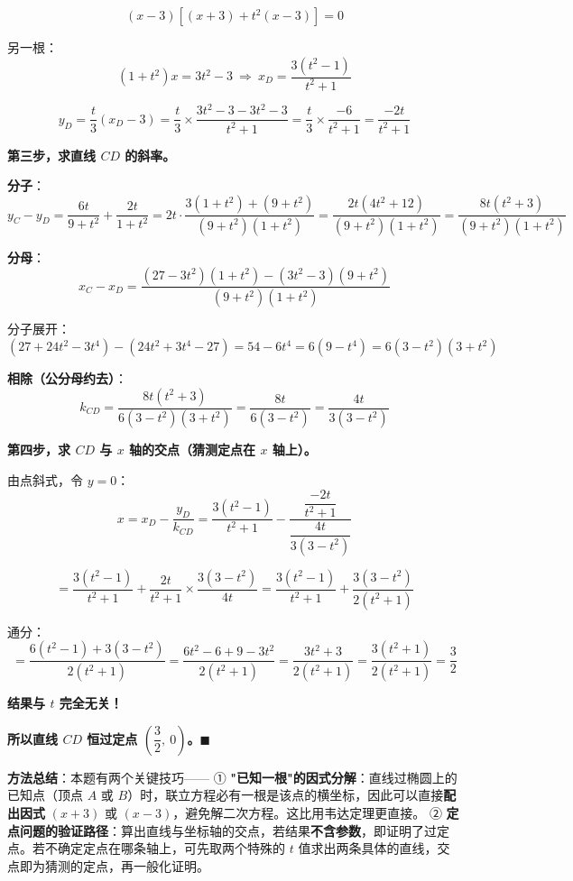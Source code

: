 \[(x-3)\left[(x+3)+t^{2}(x-3)\right]=0\]

另一根：
\[\left(1+t^{2}\right)x=3t^{2}-3\ \Longrightarrow\ x_D=\frac{3\left(t^{2}-1\right)}{t^{2}+1}\]

\[y_D=\frac t3\left(x_D-3\right)=\frac t3\times\frac{3t^{2}-3-3t^{2}-3}{t^{2}+1}=\frac t3\times\frac{-6}{t^{2}+1}=\frac{-2t}{t^{2}+1}\]

\textbf{第三步，求直线 $CD$ 的斜率。}

\textbf{分子}：
\[y_C-y_D=\frac{6t}{9+t^{2}}+\frac{2t}{1+t^{2}}=2t\cdot\frac{3\left(1+t^{2}\right)+\left(9+t^{2}\right)}{\left(9+t^{2}\right)\left(1+t^{2}\right)}=\frac{2t\left(4t^{2}+12\right)}{\left(9+t^{2}\right)\left(1+t^{2}\right)}=\frac{8t\left(t^{2}+3\right)}{\left(9+t^{2}\right)\left(1+t^{2}\right)}\]

\textbf{分母}：
\[x_C-x_D=\frac{\left(27-3t^{2}\right)\left(1+t^{2}\right)-\left(3t^{2}-3\right)\left(9+t^{2}\right)}{\left(9+t^{2}\right)\left(1+t^{2}\right)}\]

分子展开：
\[\left(27+24t^{2}-3t^{4}\right)-\left(24t^{2}+3t^{4}-27\right)=54-6t^{4}=6\left(9-t^{4}\right)=6\left(3-t^{2}\right)\left(3+t^{2}\right)\]

\textbf{相除（公分母约去）}：
\[k_{CD}=\frac{8t\left(t^{2}+3\right)}{6\left(3-t^{2}\right)\left(3+t^{2}\right)}=\frac{8t}{6\left(3-t^{2}\right)}=\frac{4t}{3\left(3-t^{2}\right)}\]

\textbf{第四步，求 $CD$ 与 $x$ 轴的交点（猜测定点在 $x$ 轴上）。}

由点斜式，令 $y=0$：
\[x=x_D-\frac{y_D}{k_{CD}}=\frac{3\left(t^{2}-1\right)}{t^{2}+1}-\frac{\dfrac{-2t}{t^{2}+1}}{\dfrac{4t}{3\left(3-t^{2}\right)}}\]

\[=\frac{3\left(t^{2}-1\right)}{t^{2}+1}+\frac{2t}{t^{2}+1}\times\frac{3\left(3-t^{2}\right)}{4t}=\frac{3\left(t^{2}-1\right)}{t^{2}+1}+\frac{3\left(3-t^{2}\right)}{2\left(t^{2}+1\right)}\]

通分：
\[=\frac{6\left(t^{2}-1\right)+3\left(3-t^{2}\right)}{2\left(t^{2}+1\right)}=\frac{6t^{2}-6+9-3t^{2}}{2\left(t^{2}+1\right)}=\frac{3t^{2}+3}{2\left(t^{2}+1\right)}=\frac{3\left(t^{2}+1\right)}{2\left(t^{2}+1\right)}=\frac32\]

\textbf{结果与 $t$ 完全无关！}

\textbf{所以直线 $CD$ 恒过定点 $\left(\dfrac32,\ 0\right)$。$\blacksquare$}

\begin{gktip}
\textbf{方法总结}：本题有两个关键技巧——
① \textbf{"已知一根"的因式分解}：直线过椭圆上的已知点（顶点 $A$ 或 $B$）时，联立方程必有一根是该点的横坐标，因此可以直接\textbf{配出因式} $(x+3)$ 或 $(x-3)$，避免解二次方程。这比用韦达定理更直接。
② \textbf{定点问题的验证路径}：算出直线与坐标轴的交点，若结果\textbf{不含参数}，即证明了过定点。若不确定定点在哪条轴上，可先取两个特殊的 $t$ 值求出两条具体的直线，交点即为猜测的定点，再一般化证明。
\end{gktip}

